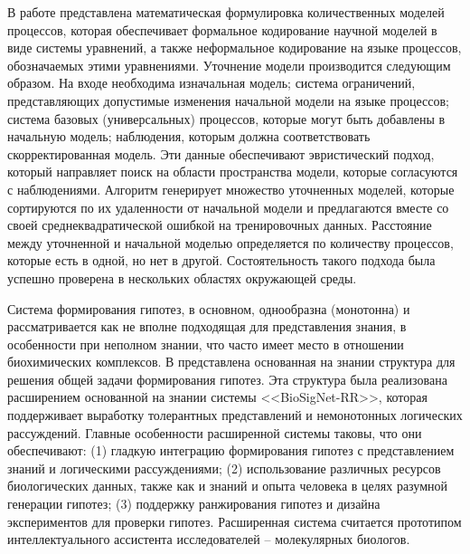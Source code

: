 В работе \cite{asgharbeygi2006inductive} представлена математическая формулировка количественных моделей процессов, 
которая обеспечивает формальное кодирование научной моделей в виде системы уравнений, а также неформальное кодирование 
на языке процессов, обозначаемых этими уравнениями. Уточнение модели производится следующим образом. На входе 
необходима изначальная модель; система ограничений, представляющих допустимые изменения начальной модели на языке 
процессов; система базовых (универсальных) процессов, которые могут быть добавлены в начальную модель; наблюдения, 
которым должна соответствовать скорректированная модель. Эти данные обеспечивают эвристический подход, который 
направляет поиск на области пространства модели, которые согласуются с наблюдениями. Алгоритм генерирует множество 
уточненных моделей, которые сортируются по их удаленности от начальной модели и предлагаются вместе со своей 
среднеквадратической ошибкой на тренировочных данных. Расстояние между уточненной и начальной моделью определяется по 
количеству процессов, которые есть в одной, но нет в другой. Состоятельность такого подхода была успешно проверена в 
нескольких областях окружающей среды.

Система формирования гипотез, в основном, однообразна (монотонна) и рассматривается как не вполне подходящая для 
представления знания, в особенности при неполном знании, что часто имеет место в отношении биохимических комплексов. 
В \cite{tran2005knowledge} представлена основанная на знании структура для решения общей задачи формирования гипотез. 
Эта структура была реализована расширением основанной на знании системы <<BioSigNet-RR>>, которая поддерживает 
выработку толерантных представлений и немонотонных логических рассуждений. Главные особенности расширенной системы 
таковы, что они обеспечивают: (1) гладкую интеграцию формирования гипотез с представлением знаний и логическими 
рассуждениями; (2) использование различных ресурсов биологических данных, также как и знаний и опыта человека в целях 
разумной генерации гипотез; (3) поддержку ранжирования гипотез и дизайна экспериментов для проверки гипотез. 
Расширенная система считается прототипом интеллектуального ассистента исследователей – молекулярных биологов.

